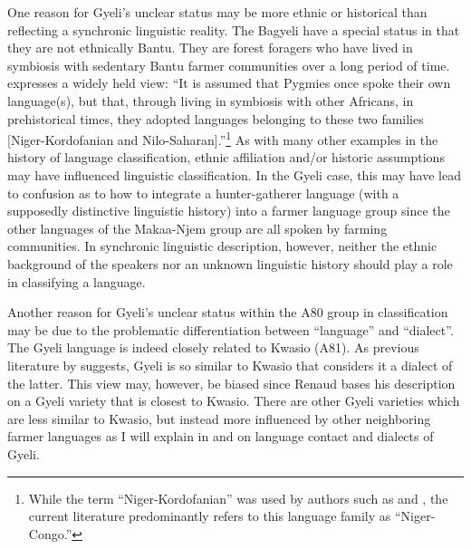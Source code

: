 One reason for Gyeli's unclear status may be more ethnic or historical than reflecting a synchronic linguistic reality. The Bagyeli have a special status in that they are not ethnically Bantu. They are forest foragers who have lived in symbiosis with sedentary Bantu farmer communities over a long period of time. \citet[154]{ruhlen94} expresses a widely held view: ``It is assumed that Pygmies once spoke their own language(s), but that, through living in symbiosis with other Africans, in prehistorical times, they adopted languages belonging to these two families [Niger-Kordofanian and Nilo-Saharan].''\footnote{While the term ``Niger-Kordofanian'' was used by authors such as \citet{ruhlen94} and \citet{welmers73}, the current literature predominantly refers to this language family  as ``Niger-Congo.''}
As with many other examples in the history of language classification, ethnic affiliation and/or historic assumptions may have influenced linguistic classification. In the Gyeli case, this may have lead to confusion as to how to integrate a hunter-gatherer language (with a supposedly distinctive linguistic history) into a farmer language group since the other languages of the Makaa-Njem group are all spoken by farming communities. In synchronic linguistic description, however, neither the ethnic background of the speakers nor an unknown linguistic history should play a role in classifying a language.

Another reason for Gyeli's unclear status within the A80 group in  classification may be due to the problematic differentiation between ``language'' and ``dialect''. The Gyeli language is indeed closely related to Kwasio (A81). As previous literature by \citet{renaud76} suggests, Gyeli is so similar to Kwasio that \citet{bahuchet2006} considers it a dialect of the latter. This view may, however, be biased since Renaud bases his description on a Gyeli variety that is closest to Kwasio. There are other Gyeli varieties which are less similar to Kwasio, but instead more influenced by other neighboring farmer languages as I will explain in  and  on language contact and dialects of Gyeli. 

